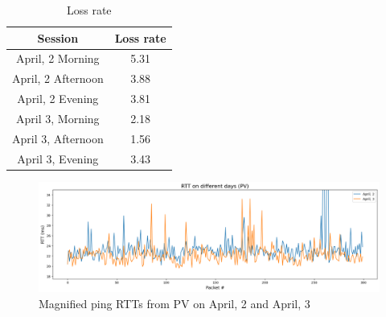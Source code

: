 \documentclass[a4paper,10pt]{article}
\begin{document}
\begin{multicols}{2}
        \begin{table}[H]
                \centering
                \caption{\small Loss rate}
                \vspace{0.3cm}
                \begin{tabular}{|c|c|}
                \hline
                \textbf{Session} & \textbf{Loss rate}\\ \hline
                April, 2 Morning & 5.31 \\ \hline
                April, 2 Afternoon & 3.88 \\ \hline
                April, 2 Evening & 3.81 \\ \hline
                April 3, Morning & 2.18 \\ \hline
                April 3, Afternoon & 1.56 \\ \hline
                April 3, Evening & 3.43 \\ \hline
                \end{tabular}
                \label{tab:lost_packets_table}
        \end{table}

\end{multicols}

        \begin{figure}[H]
                \centering
                \includegraphics[width=1\textwidth]{RTT_PV_comparison.png}
                \caption{\small Magnified ping RTTs from PV on April, 2 and April, 3}
                \label{fig:RTTs_PV_hours}
        \end{figure}
\end{document}
